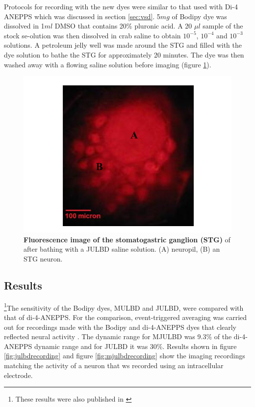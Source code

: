 Protocols for recording with the new dyes were similar to that used with Di-4 ANEPPS which was discussed in section \ref{sec:vsd}. 5$mg$ of Bodipy dye was dissolved in 1$ml$ DMSO that contains 20\% pluronic acid. A 20 $\mu l$ sample of the stock se-olution was then dissolved in crab saline to obtain $10^{-5}$, $10^{-4}$ and $10^{-3}$ solutions. A petroleum jelly well was made around the \ac{STG} and filled with the dye solution to bathe the \ac{STG} for approximately 20 minutes. The dye was then washed away with a flowing saline solution before imaging (figure \ref{fig:julbdstain}).

\begin{figure}[H]
	\begin{center}
		\includegraphics[width=\columnwidth]{graphics/julbdstain.png}
		\caption[Fluorescence image of the stomatogastric ganglion (STG)]{\textbf{Fluorescence image of the stomatogastric ganglion (STG)} of  after bathing with a JULBD saline solution. (A) neuropil, (B) an STG neuron.}
		\label{fig:julbdstain}
	\end{center}
\end{figure}

\subsection{Results}
\footnote{These results were also published in \cite{Bai2014}}The sensitivity of the Bodipy dyes, MULBD and JULBD, were compared with that of di-4-ANEPPS. For the comparison, event-triggered averaging was carried out for recordings made with the Bodipy and di-4-ANEPPS dyes that clearly reflected neural activity . The dynamic range for MJULBD was 9.3\% of the di-4-ANEPPS dynamic range and for JULBD it was 30\%. Results shown in figure \ref{fig:julbdrecording} and figure \ref{fig:mjulbdrecording} show the imaging recordings matching the activity of a neuron that ws recorded using an intracellular electrode.

